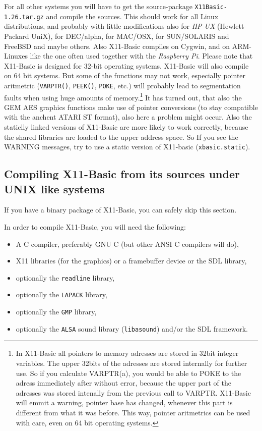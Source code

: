 For all other systems you will have to get the source-package 
\verb|X11Basic-1.26.tar.gz| and compile the sources. This should work for  all
Linux distributions, and probably with little modifications also for {\it
HP-UX} (Hewlett-Packard UniX), for DEC/alpha, for MAC/OSX, for SUN/SOLARIS and
FreeBSD and maybe others.  Also X11-Basic compiles on Cygwin, and on
ARM-Linuxes like the one often used together with the {\it Raspberry Pi}. 
Please note that X11-Basic is designed for 32-bit operating systems. 
X11-Basic will also compile on 64 bit systems. But some of the
functions may not work, especially pointer aritmetric (\verb|VARPTR()|, 
\verb|PEEK()|, \verb|POKE|, etc.)
will probably lead to segmentation faults when using huge amounts of 
memory.\footnote{In X11-Basic all pointers to memory adresses are stored in 
32bit integer variables. The upper 32bits of the adresses are stored internally
for further use. So if you calculate VARPTR(a), you would be able to 
POKE to the adress immediately after without error, because the upper part of 
the adresses was stored intenally from the previous call to VARPTR. 
X11-Basic will emmit a warning, 
pointer base has changed, whenever this part is different from what it 
was before. This way, pointer aritmetrics can be used with care, even on 64 bit 
operating systems.} It has turned out, that also the GEM AES graphics functions 
make use of pointer conversions (to stay compatible with the anchent ATARI ST format), 
also here a problem might occur. Also the staticlly linked versions of X11-Basic are
more likely to work correctly, because the shared libraries are loaded to the upper
address space. So If you see the WARNING messages, try to use a static version of 
X11-basic (\verb|xbasic.static|). 

\subsection*{Compiling X11-Basic from its sources under UNIX like systems}

If you have a binary package of X11-Basic, you can safely skip this section.

In order to compile X11-Basic, you will need the following:

\begin{itemize}
 \item A C compiler, preferably GNU C (but other ANSI C compilers will do), 
 \item X11 libraries  (for the graphics) or a framebuffer device or the SDL library,
 \item optionally the \verb|readline| library, 
 \item optionally the \verb|LAPACK| library,
 \item optionally the \verb|GMP| library,  
 \item optionally the \verb|ALSA| sound library (\verb|libasound|) and/or the SDL framework.
\end{itemize}  

